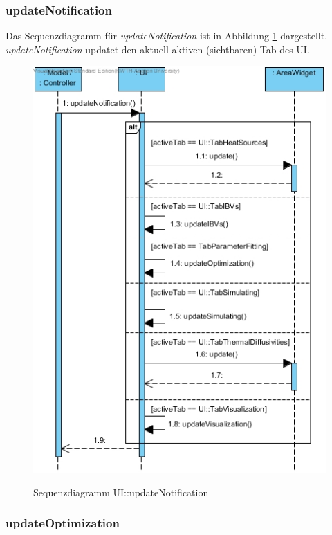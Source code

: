 \subsubsection*{updateNotification}

Das Sequenzdiagramm für \emph{updateNotification} ist in Abbildung \ref{Sequenzdiagramm UI::updateNotification} dargestellt. \emph{updateNotification} updatet den aktuell aktiven (sichtbaren) Tab des UI.

\begin{figure}[H]
	\centering
	\includegraphics[scale=.55]{Bilder/UI__updateNotification().jpg}\\
	\caption{Sequenzdiagramm UI::updateNotification}
	\label{Sequenzdiagramm UI::updateNotification}
\end{figure}

\subsubsection*{updateOptimization}

